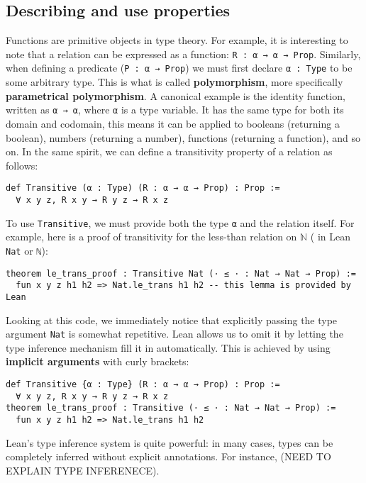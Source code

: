 \subsection{Describing and use properties}
Functions are primitive objects in type theory.
For example, it is interesting to note that a relation can be expressed as a function:
\lstinline[language=lean]|R : α → α → Prop|.
Similarly, when defining a predicate (\lstinline[language=lean]|P : α → Prop|) we must first declare 
\lstinline[language=lean]|α : Type| to be some arbitrary type. 
This is what is called \textbf{polymorphism}, more specifically \textbf{parametrical polymorphism}.
A canonical example is the identity function, written as 
\lstinline[language=lean]|α → α|, where 
\lstinline[language=lean]|α| is a type variable. 
It has the same type for 
both its domain and codomain, this means it can be 
applied to booleans (returning a boolean), numbers (returning a number), 
functions (returning a function), and so on.
In the same spirit, we can define a transitivity property of a relation as follows:
\begin{lstlisting}[language=lean]
def Transitive (α : Type) (R : α → α → Prop) : Prop :=
  ∀ x y z, R x y → R y z → R x z
\end{lstlisting}
To use \lstinline[language=lean]|Transitive|, we must provide both the type 
\lstinline[language=lean]|α| and the relation itself. 
For example, here is a proof of transitivity for the less-than relation on
 $\mathbb{N}$ ( in Lean \lstinline[language=lean]|Nat| or \lstinline[language=lean]|ℕ|):
\begin{lstlisting}[language=lean]
theorem le_trans_proof : Transitive Nat (· ≤ · : Nat → Nat → Prop) :=
  fun x y z h1 h2 => Nat.le_trans h1 h2 -- this lemma is provided by Lean 
\end{lstlisting}
Looking at this code, we immediately notice that explicitly 
passing the type argument \lstinline[language=lean]|Nat| is somewhat repetitive. 
Lean allows us to omit it by letting the type inference mechanism fill it in automatically.
This is achieved by using \textbf{implicit arguments} with curly brackets:
\begin{lstlisting}[language=lean]
def Transitive {α : Type} (R : α → α → Prop) : Prop :=
  ∀ x y z, R x y → R y z → R x z
theorem le_trans_proof : Transitive (· ≤ · : Nat → Nat → Prop) :=
  fun x y z h1 h2 => Nat.le_trans h1 h2 
\end{lstlisting}
Lean's type inference system is quite powerful: in many cases, types can be completely 
inferred without explicit annotations. For instance, (NEED TO EXPLAIN TYPE INFERENECE).
